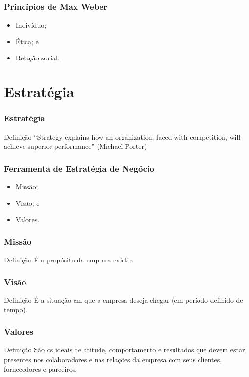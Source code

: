 \documentclass[aspectratio=169]{beamer}
\begin{document}
\begin{frame}
	\frametitle{Princípios de Max Weber}

	\begin{itemize}
		\item Indivíduo;
		\item Ética; e
		\item Rela\c cão social.
	\end{itemize}
\end{frame}

\section{Estratégia}

\begin{frame}
	\frametitle{Estratégia}

	\begin{block}{Defini\c cão}
		``Strategy explains how an organization, faced with competition, will achieve superior performance'' (Michael Porter)
	\end{block}
\end{frame}

\begin{frame}
	\frametitle{Ferramenta de Estratégia de Negócio}

	\begin{itemize}
		\item Missão;
		\item Visão; e
		\item Valores.
	\end{itemize}
\end{frame}

\begin{frame}
	\frametitle{Missão}

	\begin{block}{Defini\c cão}
		É o propósito da empresa existir.
	\end{block}
\end{frame}

\begin{frame}
	\frametitle{Visão}

	\begin{block}{Defini\c cão}
		É a situação em que a empresa deseja chegar (em período definido de tempo).
	\end{block}
\end{frame}

\begin{frame}
	\frametitle{Valores}

	\begin{block}{Defini\c cão}
		São os ideais de atitude, comportamento e resultados que devem estar presentes nos colaboradores e nas relações da empresa com seus clientes, fornecedores e parceiros.
	\end{block}
\end{frame}
\end{document}
